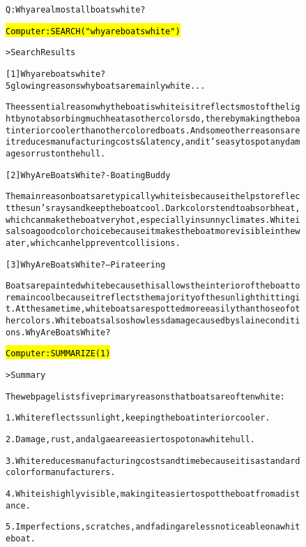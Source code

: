 \begin{figure}
\begin{AIbox}{\DV}
\parbox{1\textwidth}{\scriptsize\begin{alltt} \vspace{-6px}
Q: Why are almost all boats white?

\hl{Computer: SEARCH("why are boats white")}

> Search Results

[1] Why are boats white? 5 glowing reasons why boats are mainly white ...

The essential reason why the boat is white is it reflects most of the light by not absorbing much heat as other colors do, thereby making the boat interior cooler than other colored boats. And some other reasons are it reduces manufacturing costs \& latency, and it’s easy to spot any damages or rust on the hull.

[2] Why Are Boats White? - Boating Buddy

The main reason boats are typically white is because it helps to reflect the sun’s rays and keep the boat cool. Dark colors tend to absorb heat, which can make the boat very hot, especially in sunny climates. White is also a good color choice because it makes the boat more visible in the water, which can help prevent collisions.

[3] Why Are Boats White? – Pirateering

Boats are painted white because this allows the interior of the boat to remain cool because it reflects the majority of the sunlight hitting it. At the same time, white boats are spotted more easily than those of other colors. White boats also show less damage caused by slaine conditions. Why Are Boats White?

\hl{Computer: SUMMARIZE(1)}

> Summary

The webpage lists five primary reasons that boats are often white:

1. White reflects sunlight, keeping the boat interior cooler.

2. Damage, rust, and algae are easier to spot on a white hull.

3. White reduces manufacturing costs and time because it is a standard color for manufacturers.

4. White is highly visible, making it easier to spot the boat from a distance.

5. Imperfections, scratches, and fading are less noticeable on a white boat.


\end{alltt}}
\end{AIbox}
\end{figure}
